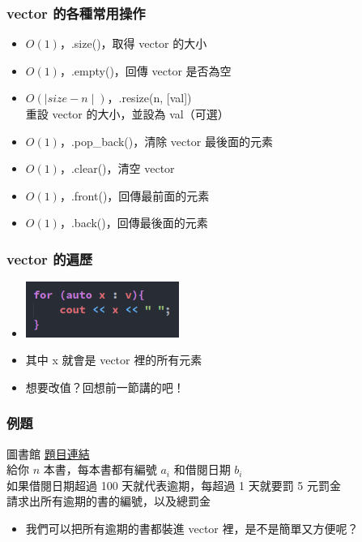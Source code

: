 \documentclass[mathserif]{beamer}
\begin{document}
\begin{frame}
    \frametitle{vector 的各種常用操作}
    \begin{itemize}
        \item $O(1)$，.size()，取得 vector 的大小
        \item $O(1)$，.empty()，回傳 vector 是否為空
        \item $O(\mid size-n \mid )$，.resize({\color[rgb]{1,0,0}n}, {\color[rgb]{1,0,0}[val]})\\
        重設 vector 的大小，並設為 val（可選）
        \item $O(1)$，.pop\_back()，清除 vector 最後面的元素
        \item $O(1)$，.clear()，清空 vector
        \item $O(1)$，.front()，回傳最前面的元素
        \item $O(1)$，.back()，回傳最後面的元素
    \end{itemize}
\end{frame}

\begin{frame}
    \frametitle{vector 的遍歷}
    \begin{itemize}
        \item \includegraphics[width=5.0cm]{img/3-3.png}
        \item 其中 x 就會是 vector 裡的所有元素
        \item 想要改值？回想前一節講的吧！
    \end{itemize}
\end{frame}

\begin{frame}
    \frametitle{例題}
    \begin{block}{圖書館}
        \href{https://zerojudge.tw/ShowProblem?problemid=f819}{題目連結}\\
        給你 $n$ 本書，每本書都有編號 $a_i$ 和借閱日期 $b_i$\\
        如果借閱日期超過 100 天就代表逾期，每超過 1 天就要罰 5 元罰金\\
        請求出所有逾期的書的編號，以及總罰金
    \end{block}
    \begin{itemize}
        \item<2-> 我們可以把所有逾期的書都裝進 vector 裡，是不是簡單又方便呢？
    \end{itemize}
\end{frame}
\end{document}
